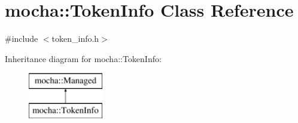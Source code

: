 \hypertarget{classmocha_1_1_token_info}{
\section{mocha::TokenInfo Class Reference}
\label{classmocha_1_1_token_info}
}


{\ttfamily \#include $<$token\_\-info.h$>$}

Inheritance diagram for mocha::TokenInfo:\begin{figure}[H]
\begin{center}
\leavevmode
\includegraphics[height=2.000000cm]{classmocha_1_1_token_info}
\end{center}
\end{figure}
